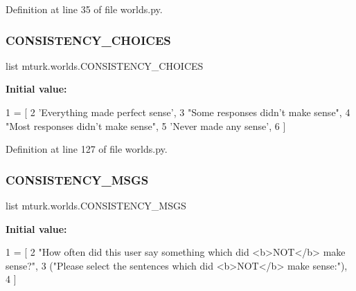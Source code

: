 Definition at line 35 of file worlds.\+py.

\mbox{\label{namespacemturk_1_1worlds_a8c3b1162ca474cc812766e3e83d63879}} 
\subsubsection{\texorpdfstring{C\+O\+N\+S\+I\+S\+T\+E\+N\+C\+Y\+\_\+\+C\+H\+O\+I\+C\+ES}{CONSISTENCY\_CHOICES}}
{\footnotesize\ttfamily list mturk.\+worlds.\+C\+O\+N\+S\+I\+S\+T\+E\+N\+C\+Y\+\_\+\+C\+H\+O\+I\+C\+ES}

{\bfseries Initial value\+:}
\begin{DoxyCode}
1 =  [
2     \textcolor{stringliteral}{'Everything made perfect sense'},
3     \textcolor{stringliteral}{"Some responses didn't make sense"},
4     \textcolor{stringliteral}{"Most responses didn't make sense"},
5     \textcolor{stringliteral}{'Never made any sense'},
6 ]
\end{DoxyCode}


Definition at line 127 of file worlds.\+py.

\mbox{\label{namespacemturk_1_1worlds_a0a7f2bad20151d2c68bb1a2668cfd420}} 
\subsubsection{\texorpdfstring{C\+O\+N\+S\+I\+S\+T\+E\+N\+C\+Y\+\_\+\+M\+S\+GS}{CONSISTENCY\_MSGS}}
{\footnotesize\ttfamily list mturk.\+worlds.\+C\+O\+N\+S\+I\+S\+T\+E\+N\+C\+Y\+\_\+\+M\+S\+GS}

{\bfseries Initial value\+:}
\begin{DoxyCode}
1 =  [
2     \textcolor{stringliteral}{"How often did this user say something which did <b>NOT</b> make sense?"},
3     (\textcolor{stringliteral}{"Please select the sentences which did <b>NOT</b> make sense:"}),
4 ]
\end{DoxyCode}


